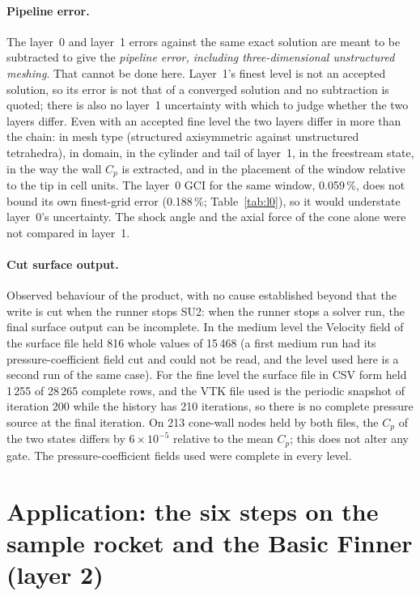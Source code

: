 \documentclass[11pt,a4paper]{article}
\newcommand{\Cp}{C_p}
\begin{document}
\paragraph{Pipeline error.}
The layer~0 and layer~1 errors against the same exact solution are meant to be subtracted to give the \emph{pipeline error,
including three-dimensional unstructured meshing}.
That cannot be done here.
Layer~1's finest level is not an accepted solution, so its error is not that of a converged solution and no subtraction is
quoted; there is also no layer~1 uncertainty with which to judge whether the two layers differ.
Even with an accepted fine level the two layers differ in more than the chain: in mesh type (structured axisymmetric against
unstructured tetrahedra), in domain, in the cylinder and tail of layer~1, in the freestream state, in the way the wall
$\Cp$ is extracted, and in the placement of the window relative to the tip in cell units.
The layer~0 GCI for the same window, 0.059\,\%, does not bound its own finest-grid error (0.188\,\%; Table~\ref{tab:l0}),
so it would understate layer~0's uncertainty.
The shock angle and the axial force of the cone alone were not compared in layer~1.

\paragraph{Cut surface output.}
Observed behaviour of the product, with no cause established beyond that the write is cut when the runner stops SU2:
when the runner stops a solver run, the final surface output can be incomplete.
In the medium level the Velocity field of the surface file held 816 whole values of 15\,468 (a first medium run had its pressure-coefficient
field cut and could not be read, and the level used here is a second run of the same case).
For the fine level the surface file in CSV form held 1\,255 of 28\,265 complete rows, and the VTK file used is the periodic snapshot of
iteration 200 while the history has 210 iterations, so there is no complete pressure source at the final iteration.
On 213 cone-wall nodes held by both files, the $\Cp$ of the two states differs by $6\times10^{-5}$ relative to the mean
$\Cp$; this does not alter any gate.
The pressure-coefficient fields used were complete in every level.

\section{Application: the six steps on the sample rocket and the Basic Finner (layer 2)}
\label{sec:application}
\end{document}
